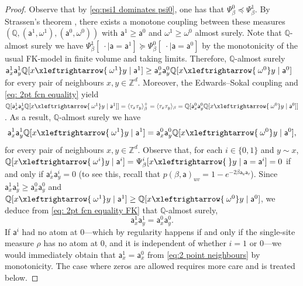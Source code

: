 \documentclass[11pt,a4paper]{article}
\numberwithin{equation}{section}
\theoremstyle{plain}
\theoremstyle{definition}
\newcommand{\connect}{\xleftrightarrow}
\begin{document}
\begin{proof} 
Observe that by \eqref{eq:psi1 dominates psi0}, one has that $\Psi^0_\beta \preccurlyeq \Psi^1_\beta$. By Strassen's theorem \cite{Strassen1965}, there exists a monotone coupling between these measures $(\mathbb Q, (\mathsf{a}^1, \omega^1), (\mathsf a^0, \omega^0))$ with $\mathsf a^1 \geq \mathsf a^0$ and $\omega^1\geq \omega^0$ almost surely. 
Note that $\mathbb Q$-almost surely we have $\Psi^1_{\beta}[ \;\cdot \mid \mathsf a = \mathsf{a}^1 ] \succcurlyeq \Psi^0_{\beta}[ \; \cdot \mid \mathsf a = \mathsf{a}^0 ]$ by the monotonicity of the usual FK-model in finite volume and taking limits. Therefore, $\mathbb Q$-almost surely
$\mathsf{a}^1_x\mathsf{a}^1_y \mathbb{Q}[ x\connect{\:\omega^1} y \mid \mathsf{a}^1] \geq \mathsf{a}^0_x\mathsf{a}^0_y \mathbb{Q}[ x\connect{\:\omega^0} y \mid \mathsf{a}^0]$  for every pair of neighbours $x,y\in\mathbb{Z}^d$. Moreover, the Edwards--Sokal coupling and \eqref{eq: 2pt fcn equality} yield $\mathbb{Q}[\mathsf{a}^1_x\mathsf{a}^1_y \mathbb{Q}[ x\connect{\:\omega^1} y \mid \mathsf{a}^1]] = \langle \tau_x \tau_y\rangle_\beta^+ = \langle \tau_x \tau_y \rangle_\beta = \mathbb{Q}[\mathsf{a}^0_x\mathsf{a}^0_y \mathbb{Q}[ x\connect{\:\omega^0} y \mid \mathsf{a}^0]]$. As a result, $\mathbb Q$-almost surely we have
\begin{equation}\label{eq: 2pt fcn equality FK}
    \mathsf{a}^1_x\mathsf{a}^1_y \mathbb{Q}[ x\connect{\:\omega^1} y \mid \mathsf{a}^1] = \mathsf{a}^0_x\mathsf{a}^0_y \mathbb{Q}[ x\connect{\:\omega^0} y \mid \mathsf{a}^0],
\end{equation}
for every pair of neighbours $x,y\in \mathbb Z^d$. 
Observe that, for each $i \in \{0,1\}$ and $y\sim x$, $\mathbb{Q}[ x\connect{\:\omega^i} y \mid \mathsf{a}^i]=\Psi^i_{\beta}[ x\connect{\:} y \mid \mathsf a = \mathsf{a}^i] = 0$ if and only if $\mathsf a^i_x\mathsf a^i_y = 0$ (to see this, recall that $p(\beta, \mathsf a)_{uv}=1-e^{-2\beta \mathsf a_u \mathsf a_v}$). Since $\mathsf a^1_x \mathsf a^1_y \geq \mathsf a^0_x \mathsf a^0_y$ and $\mathbb{Q}[ x\connect{\:\omega^1} y \mid \mathsf{a}^1]\geq \mathbb{Q}[ x\connect{\:\omega^0} y \mid \mathsf{a}^0]$, we deduce from \eqref{eq: 2pt fcn equality FK} that $\mathbb Q$-almost surely, 
\begin{equation}\label{eq:2 point neighbours}
\mathsf a^1_x \mathsf a^1_y = \mathsf a^0_x \mathsf a^0_y.
\end{equation}
If $\mathsf a^i$ had no atom at $0$---which by regularity happens if and only if the single-site measure $\rho$ has no atom at $0$, and it is independent of whether $i=1$ or $0$---we would immediately obtain that $\mathsf a^1_x=\mathsf a^0_x$ from \eqref{eq:2 point neighbours} by monotonicity. The case where zeros are allowed requires more care and is treated below.


\end{proof}
\end{document}
